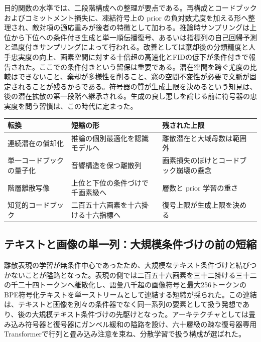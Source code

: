 \documentclass[lualatex,a4paper,10pt]{jlreq}
\begin{document}
目的関数の水準では、二段階構成への整理が要点である。再構成とコードブックおよびコミットメント損失に、凍結符号上の prior の負対数尤度を加える形へ整理され、敵対項の適応重みが後者の特徴として加わる\autocite{btd004}。推論時サンプリングは上位から下位への条件付き生成と単一順伝播復号、あるいは指標列の自己回帰予測と温度付きサンプリングによって行われる\autocite{btd003}。改善としては棄却後の分類精度と人手忠実度の向上、画素空間に対する十倍超の高速化とFIDの低下が条件付きで報告された\autocite{btd003,btd004}。ここでの条件付きという留保は重要である。潜在空間を跨ぐ尤度の比較はできないこと、棄却が多様性を削ること、窓の空間不変性が必要で文脈が固定されることが残るからである。符号器の質が生成上限を決めるという知見は、後の潜在拡散の第一段階へ継承される。生成の良し悪しを論じる前に符号器の忠実度を問う習慣は、この時代に定まった。

\begin{center}
\small
\begin{tabularx}{\textwidth}{@{}p{}p{}X@{}}
\toprule
転換 & 短縮の形 & 残された上限 \\
\midrule
連続潜在の償却化 & 推論の個別最適化を認識モデルへ & 離散潜在と大域母数は範囲外 \\
単一コードブックの量子化 & 音響構造を保つ離散列 & 画素損失のぼけとコードブック崩壊の懸念 \\
階層離散写像 & 上位と下位の条件づけで千画素級へ & 層数と prior 学習の重さ \\
知覚的コードブック & 二百五十六画素を十六掛ける十六指標へ & 復号上限が生成上限を決める \\
\bottomrule
\end{tabularx}
\end{center}

\subsection{テキストと画像の単一列：大規模条件づけの前の短縮}
離散表現の学習が無条件中心であったため、大規模なテキスト条件づけと結びつかないことが隘路となった。表現の側では二百五十六画素を三十二掛ける三十二の千二十四トークンへ離散化し、語彙八千超の画像符号と最大256トークンのBPE符号化テキストを単一ストリームとして連結する短縮が採られた\autocite{btd005}。この連結は、テキストと画像を別々の条件器でなく同一系列の要素として扱う発想であり、後の大規模テキスト条件づけの先駆けとなった。アーキテクチャとしては畳み込み符号器と復号器にガンベル緩和の隘路を設け、六十層級の疎な復号器専用Transformerで行列と畳み込み注意を束ね、分散学習で扱う構成が選ばれた\autocite{btd005}。
\end{document}

